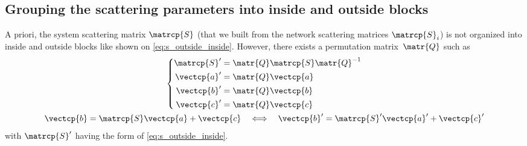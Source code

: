 
\subsection{Grouping the scattering parameters into inside and outside blocks}
A priori, the system scattering matrix $\matrcp{S}$ (that we built from the network scattering matrices $\matrcp{S}_i$) is not organized into inside and outside blocks like shown on \cref{eq:s_outside_inside}.
However, there exists a permutation matrix~$\matr{Q}$ such as
\begin{gather}
    \left\lbrace
    \begin{aligned}
        \matrcp{S}' &= \matr{Q} \matrcp{S} \matr{Q}^{-1} \\
        \vectcp{a}' &= \matr{Q} \vectcp{a} \\
        \vectcp{b}' &= \matr{Q} \vectcp{b} \\
        \vectcp{c}' &= \matr{Q} \vectcp{c}
    \end{aligned}
    \right.
    \label{eq:permute_s}
    \\
    \vectcp{b} = \matrcp{S} \vectcp{a} + \vectcp{c}
    \quad \Longleftrightarrow \quad
    \vectcp{b}' = \matrcp{S}' \vectcp{a}' + \vectcp{c}'
    \label{eq:permute_s_equiv}
\end{gather}
with $\matrcp{S}'$ having the form of \cref{eq:s_outside_inside}.

